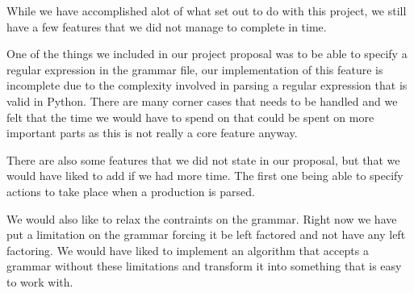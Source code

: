While we have accomplished alot of what set out to do with this project, we still have a few features that we did not manage to complete in time.\par
One of the things we included in our project proposal was to be able to specify a regular expression in the grammar file, our implementation of this feature is incomplete due to the complexity involved in parsing a regular expression that is valid in Python. There are many corner cases that needs to be handled and we felt that the time we would have to spend on that could be spent on more important parts as this is not really a core feature anyway.\par
There are also some features that we did not state in our proposal, but that we would have liked to add if we had more time. The first one being able to specify actions to take place when a production is parsed.\par
We would also like to relax the contraints on the grammar. Right now we have put a limitation on the grammar forcing it be left factored and not have any left factoring. We would have liked to implement an algorithm that accepts a grammar without these limitations and transform it into something that is easy to work with.
